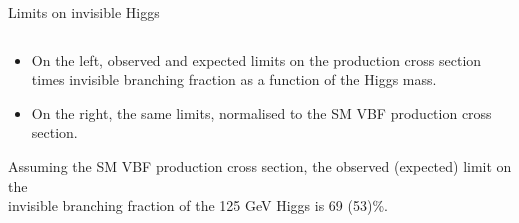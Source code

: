 \documentclass[8pt]{beamer}
\begin{document}
\begin{frame}{Limits on invisible Higgs}
\begin{columns}
\begin{block}
\end{block}

\end{columns}

\begin{itemize}
 \item On the left, observed and expected limits on the production cross section times invisible branching fraction as a function of the Higgs mass. 
 \item On the right, the same limits, normalised to the SM VBF production cross section.
\end{itemize}

Assuming the SM VBF production cross section, the observed (expected) limit on the \\ invisible branching fraction of the 125 GeV Higgs is 69 (53)\%. 

\end{frame}
\end{document}
